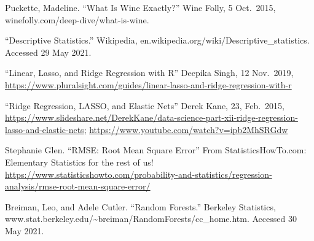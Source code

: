 \documentclass[
]{book}
\begin{document}
Puckette, Madeline. ``What Is Wine Exactly?'' Wine Folly, 5 Oct.~2015, winefolly.com/deep-dive/what-is-wine.

``Descriptive Statistics.'' Wikipedia, en.wikipedia.org/wiki/Descriptive\_statistics. Accessed 29 May 2021.

``Linear, Lasso, and Ridge Regression with R'' Deepika Singh, 12 Nov.~2019, \url{https://www.pluralsight.com/guides/linear-lasso-and-ridge-regression-with-r}

``Ridge Regression, LASSO, and Elastic Nets'' Derek Kane, 23, Feb.~2015, \url{https://www.slideshare.net/DerekKane/data-science-part-xii-ridge-regression-lasso-and-elastic-nets}; \url{https://www.youtube.com/watch?v=ipb2MhSRGdw}

Stephanie Glen. ``RMSE: Root Mean Square Error'' From StatisticsHowTo.com: Elementary Statistics for the rest of us! \url{https://www.statisticshowto.com/probability-and-statistics/regression-analysis/rmse-root-mean-square-error/}

Breiman, Leo, and Adele Cutler. ``Random Forests.'' Berkeley Statistics, www.stat.berkeley.edu/\textasciitilde breiman/RandomForests/cc\_home.htm. Accessed 30 May 2021.

  
\end{document}
